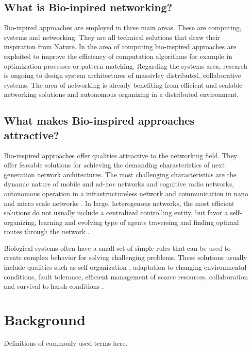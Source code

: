 \documentclass{IWORK2014}
\begin{document}
\subsection{What is Bio-inpired networking?}
Bio-inpired approaches are employed in three main areas. These are computing, systems and networking. They are all technical solutions that draw their inspiration from Nature. In the area of computing bio-inspired approaches are exploited to improve the efficiency of computation algorithms for example in optimization processes or pattern matching. Regarding the systems area, research is ongoing to design system architectures of massivley distributed, collaborative systems. The area of networking is already benefiting from efficient and scalable networking solutions and autonomous organizing in a distributed environment. \cite{dressler2010bio}

\subsection{What makes Bio-inspired approaches attractive?} 
Bio-inspired approaches offer qualities attractive to the networking field. They offer feasable solutions for achieving the demanding charasteristics of next generation network architectures. The most challenging characteristics are the dynamic nature of mobile and ad-hoc networks and cognitive radio networks, autonomous operation in a infrastructureless network and communication in nano and micro scale networks \cite{dressler2010bio}. In large, heterogenous networks, the most efficient solutions do not usually include a centralized controlling entity, but favor a self-organizing, learning and evolving type of agents traversing and finding optimal routes through the network \cite{dressler2010bio}.

Biological systems often have a small set of simple rules that can be used to create complex behavior \cite{dressler2010bio} for solving challenging problems. These solutions usually include qualities such as self-organization \cite{kroeker2011biology}, adaptation to changing environmental conditions, fault tolerance, efficient management of scarce resources, collaboration and survival to harsh conditions \cite{dressler2010bio}.

\section{Background}
Definitions of commonly used terms here.
\end{document}

